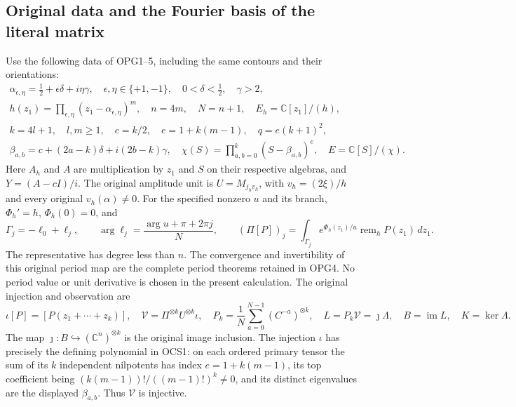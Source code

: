\documentclass[11pt,a4paper]{article}
\begin{document}
\subsection{Original data and the Fourier basis of the literal matrix}
Use the following data of OPG1--5, including the same contours and
their orientations:
\[
 \begin{gathered}
 \alpha_{\epsilon,\eta}=\tfrac12+\epsilon\delta+i\eta\gamma,
 \quad\epsilon,\eta\in\{+1,-1\},\quad0<\delta<\tfrac12,\quad\gamma>2,\\
 h(z_1)=\prod_{\epsilon,\eta}(z_1-\alpha_{\epsilon,\eta})^m,
 \quad n=4m,\quad N=n+1,\quad E_h=\mathbb C[z_1]/(h),\\
 k=4l+1,\quad l,m\geq1,\quad c=k/2,
 \quad e=1+k(m-1),\quad q=e(k+1)^2,\\
 \beta_{a,b}=c+(2a-k)\delta+i(2b-k)\gamma,
 \quad\chi(S)=\prod_{a,b=0}^k(S-\beta_{a,b})^e,
 \quad E=\mathbb C[S]/(\chi).
 \end{gathered}\tag{OCS1}
\]
Here $A_h$ and $A$ are multiplication by $z_1$ and $S$ on their
respective algebras, and $Y=(A-cI)/i$. The original amplitude
unit is $U=M_{j_hv_h}$, with $v_h=(2\xi)/h$ and every original
$v_h(\alpha)\ne0$. For the specified nonzero $u$ and its branch,
$\Phi_h'=h$, $\Phi_h(0)=0$, and
\[
 \Gamma_j=-\ell_0+\ell_j,\qquad
 \arg\ell_j=\frac{\arg u+\pi+2\pi j}{N},\qquad
 (\Pi[P])_j=\int_{\Gamma_j}e^{\Phi_h(z_1)/u}
                       \operatorname{rem}_hP(z_1)\,dz_1.
 \tag{OCS2}
\]
The representative has degree less than $n$. The convergence and
invertibility of this original period map are the complete period
theorems retained in OPG4. No period value or unit derivative is
chosen in the present calculation. The original injection and
observation are
\[
 \iota[P]=[P(z_1+\cdots+z_k)],\quad
 \mathcal V=\Pi^{\otimes k}U^{\otimes k}\iota,
 \quad P_k=\frac1N\sum_{a=0}^{N-1}(C^{-a})^{\otimes k},
 \quad L=P_k\mathcal V=\jmath\Lambda,
 \quad B=\operatorname{im}L,\quad K=\ker\Lambda.
 \tag{OCS3}
\]
The map $\jmath:B\hookrightarrow(\mathbb C^n)^{\otimes k}$
is the original image inclusion. The injection $\iota$ has precisely
the defining polynomial in OCS1: on each ordered primary tensor
the sum of its $k$ independent nilpotents has index
$e=1+k(m-1)$, its top coefficient being
$(k(m-1))!/((m-1)!)^k\ne0$, and its distinct eigenvalues are
the displayed $\beta_{a,b}$. Thus $\mathcal V$ is injective.
\end{document}
